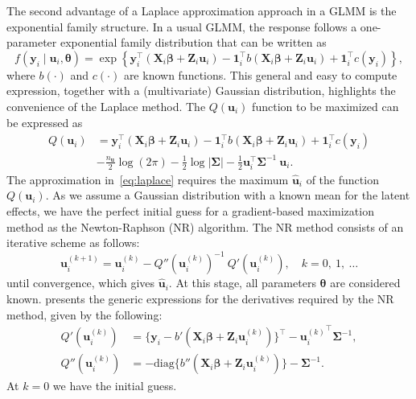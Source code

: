 The second advantage of a Laplace approximation approach in a GLMM is
the exponential family structure. In a usual GLMM, the response follows
a one-parameter exponential family distribution that can be written as
\[
  f(\mathbf{y}_{i} \mid \mathbf{u}_{i}, \bm{\theta}) = \exp
  \left\{\mathbf{y}_{i}^{\top}
    (\mathbf{X}_{i}\bm{\beta} + \mathbf{Z}_{i}\mathbf{u}_{i}) -
    \mathbf{1}_{i}^{\top}
    b(\mathbf{X}_{i}\bm{\beta} + \mathbf{Z}_{i}\mathbf{u}_{i}) +
    \mathbf{1}_{i}^{\top} c(\mathbf{y}_{i})
  \right\},
\]
where \(b(\cdot)\) and \(c(\cdot)\) are known functions. This general
and easy to compute expression, together with a (multivariate) Gaussian
distribution, highlights the convenience of the Laplace method. The
\(Q(\mathbf{u}_{i})\) function to be maximized can be expressed as
\begin{equation}
  \begin{aligned}
    Q(\mathbf{u}_{i}) &= \mathbf{y}_{i}^{\top}
    (\mathbf{X}_{i}\bm{\beta} + \mathbf{Z}_{i}\mathbf{u}_{i}) -
    \mathbf{1}_{i}^{\top}
    b(\mathbf{X}_{i}\bm{\beta} + \mathbf{Z}_{i}\mathbf{u}_{i}) +
    \mathbf{1}_{i}^{\top} c(\mathbf{y}_{i})\\
    &- \frac{n_{\mathbf{u}}}{2} \log (2\pi) -
    \frac{1}{2} \log |\bm{\Sigma}| -
    \frac{1}{2} \mathbf{u}_{i}^{\top}\bm{\Sigma}^{-1}~\mathbf{u}_{i}.
  \end{aligned}
\end{equation}
The approximation in~\autoref{eq:laplace} requires the maximum
\(\mathbf{\hat{u}}_{i}\) of the function \(Q(\mathbf{u}_{i})\). As we
assume a Gaussian distribution with a known mean for the latent effects,
we have the perfect initial guess for a gradient-based maximization
method as the Newton-Raphson (NR) algorithm. The NR method consists of
an iterative scheme as follows:
\[
  \mathbf{u}_{i}^{(k+1)} = \mathbf{u}_{i}^{(k)} -
  {Q}''(\mathbf{u}_{i}^{(k)})^{-1}~{Q}'(\mathbf{u}_{i}^{(k)}),
  \quad k = 0,~1,~\dots
\]
until convergence, which gives \(\mathbf{\hat{u}}_{i}\). At this stage,
all parameters \(\bm{\theta}\) are considered known. 
presents the generic expressions for the derivatives required by the NR
method, given by the following:
\begin{equation}
  \begin{aligned}
    {Q}'(\mathbf{u}_{i}^{(k)}) &= \{\mathbf{y}_{i} -
    {b}'(\mathbf{X}_{i}\bm{\beta} +
    \mathbf{Z}_{i}\mathbf{u}_{i}^{(k)})\}^{\top} -
    {\mathbf{u}_{i}^{(k)}}^{\top} \bm{\Sigma}^{-1},\\
    {Q}''(\mathbf{u}_{i}^{(k)}) &=
    - \text{diag}\{{b}''(\mathbf{X}_{i}\bm{\beta} +
    \mathbf{Z}_{i}\mathbf{u}_{i}^{(k)})\} - \bm{\Sigma}^{-1}.
  \end{aligned}
  \nonumber
\end{equation}
At \(k = 0\) we have the initial guess.

